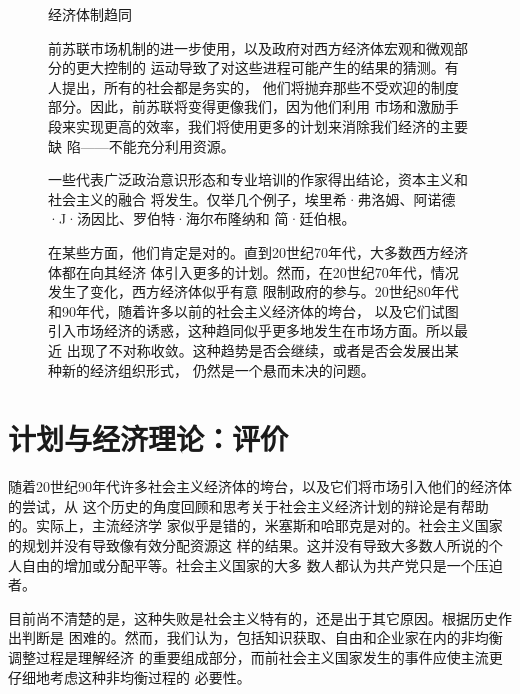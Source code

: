 \begin{figure}[ht]
  \centering
  \begin{mybox}{经济体制趋同}
    \begin{multicols}{2}
      前苏联市场机制的进一步使用，以及政府对西方经济体宏观和微观部分的更大控制的
      运动导致了对这些进程可能产生的结果的猜测。有人提出，所有的社会都是务实的，
      他们将抛弃那些不受欢迎的制度部分。因此，前苏联将变得更像我们，因为他们利用
      市场和激励手段来实现更高的效率，我们将使用更多的计划来消除我们经济的主要缺
      陷——不能充分利用资源。

      一些代表广泛政治意识形态和专业培训的作家得出结论，资本主义和社会主义的融合
      将发生。仅举几个例子，埃里希·弗洛姆、阿诺德·J·汤因比、罗伯特·海尔布隆纳和
      简·廷伯根。

      在某些方面，他们肯定是对的。直到20世纪70年代，大多数西方经济体都在向其经济
      体引入更多的计划。然而，在20世纪70年代，情况发生了变化，西方经济体似乎有意
      限制政府的参与。20世纪80年代和90年代，随着许多以前的社会主义经济体的垮台，
      以及它们试图引入市场经济的诱惑，这种趋同似乎更多地发生在市场方面。所以最近
      出现了不对称收敛。这种趋势是否会继续，或者是否会发展出某种新的经济组织形式，
      仍然是一个悬而未决的问题。
    \end{multicols}
  \end{mybox}
\end{figure}

\section{计划与经济理论：评价}

随着20世纪90年代许多社会主义经济体的垮台，以及它们将市场引入他们的经济体的尝试，从
这个历史的角度回顾和思考关于社会主义经济计划的辩论是有帮助的。实际上，主流经济学
家似乎是错的，米塞斯和哈耶克是对的。社会主义国家的规划并没有导致像有效分配资源这
样的结果。这并没有导致大多数人所说的个人自由的增加或分配平等。社会主义国家的大多
数人都认为共产党只是一个压迫者。

目前尚不清楚的是，这种失败是社会主义特有的，还是出于其它原因。根据历史作出判断是
困难的。然而，我们认为，包括知识获取、自由和企业家在内的非均衡调整过程是理解经济
的重要组成部分，而前社会主义国家发生的事件应使主流更仔细地考虑这种非均衡过程的
必要性。


